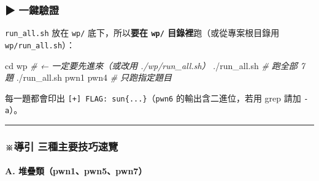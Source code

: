\documentclass[10pt,a4paper]{article}
\newenvironment{Shaded}{\begin{snugshade}}{\end{snugshade}}
\newcommand{\BuiltInTok}[1]{#1}
\newcommand{\CommentTok}[1]{\textcolor[rgb]{0.56,0.35,0.01}{\textit{#1}}}
\newcommand{\ExtensionTok}[1]{#1}
\newcommand{\NormalTok}[1]{#1}
\renewenvironment{Shaded}{%
  \def\FrameCommand{\fboxsep=3.2pt\colorbox{shadecolor}}%
  \MakeFramed{\advance\hsize-\width\FrameRestore\small}%
}{%
  \endMakeFramed
}
\begin{document}
\subsubsection{▶ 一鍵驗證}\label{ux4e00ux9375ux9a57ux8b49}

\texttt{run\_\allowbreak{}all.\allowbreak{}sh} 放在 \texttt{wp/} 底下，所以\textbf{要在
\texttt{wp/} 目錄裡}跑（或從專案根目錄用 \texttt{wp/\allowbreak{}run\_\allowbreak{}all.\allowbreak{}sh}）：

\begin{Shaded}
\begin{Highlighting}[]
\BuiltInTok{cd}\NormalTok{ wp                     }\CommentTok{\# ← 一定要先進來（或改用 ./wp/run\_all.sh）}
\ExtensionTok{./run\_all.sh}              \CommentTok{\# 跑全部 7 題}
\ExtensionTok{./run\_all.sh}\NormalTok{ pwn1 pwn4    }\CommentTok{\# 只跑指定題目}
\end{Highlighting}
\end{Shaded}

每一題都會印出 \texttt{{[}+{]}\ \allowbreak{}FLAG:\allowbreak{}\ \allowbreak{}sun\{\allowbreak{}...\allowbreak{}\}\allowbreak{}}（\texttt{pwn6}
的輸出含二進位，若用 grep 請加 \texttt{-\allowbreak{}a}）。

\begin{center}\rule{0.5\linewidth}{0.5pt}\end{center}

\subsubsection{※導引
三種主要技巧速覽}\label{ux5c0eux5f15-ux4e09ux7a2eux4e3bux8981ux6280ux5de7ux901fux89bd}

\paragraph{A.
堆疊類（pwn1、pwn5、pwn7）}\label{a.-ux5806ux758aux985epwn1pwn5pwn7}
\end{document}
